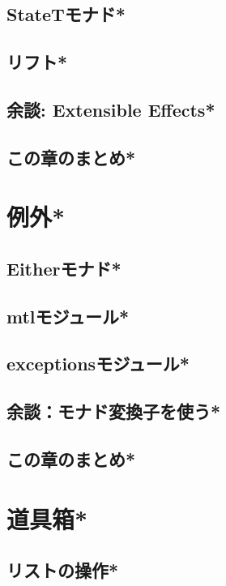\documentclass[a5paper,twoside,fleqn]{jsbook}
\begin{document}
\section{StateTモナド*}
\section{リフト*}
\section{余談: Extensible Effects*}
\section{この章のまとめ*}

\chapter{例外*}
\section{Eitherモナド*}
\section{mtlモジュール*}
\section{exceptionsモジュール*}
\section{余談：モナド変換子を使う*}
\section{この章のまとめ*}


\chapter{道具箱*}
\section{リストの操作*}
\end{document}
